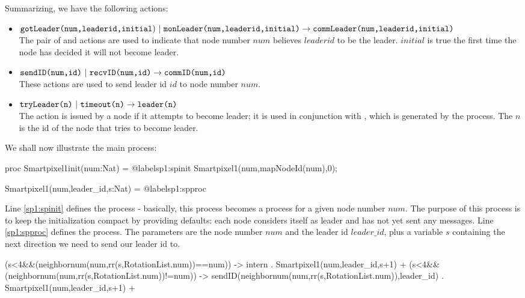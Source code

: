 Summarizing, we have the following actions:

\begin{itemize}
\item $\texttt{gotLeader(num,leaderid,initial}) ~|~ \texttt{monLeader(num,leaderid,initial)} \rightarrow \\ \texttt{commLeader(num,leaderid,initial)}$ \\
The pair of  and  actions are used to indicate that node number $num$ believes $leaderid$ to be the leader. $initial$ is true the first time the node has decided it will not become leader.
\item $\texttt{sendID(num,id)} ~|~ \texttt{recvID(num,id)} \rightarrow \texttt{commID(num,id)}$ \\
These actions are used to send leader id $id$ to node number $num$.
\item $\texttt{tryLeader(n)} ~|~ \texttt{timeout(n)} \rightarrow \texttt{leader(n)}$ \\
The  action is issued by a node if it attempts to become leader; it is used in conjunction with , which is generated by the  process. The $n$ is the id of the node that tries to become leader.
\end{itemize}

We shall now illustrate the main  process:

\begin{codeverb}
proc	Smartpixel1init(num:Nat) = @label{sp1:spinit}
	 Smartpixel1(num,mapNodeId(num),0); 

	Smartpixel1(num,leader_id,s:Nat) = @label{sp1:spproc}
\end{codeverb}

Line \ref{sp1:spinit} defines the  process - basically, this process becomes a  process for a given node number $num$. The purpose of this process is to keep the initialization compact by providing defaults: each node considers itself as leader and has not yet sent any messages. Line \ref{sp1:spproc} defines the  process. The parameters are the node number $num$ and the leader id $leader\_id$, plus a variable $s$ containing the next direction we need to send our leader id to.

\begin{codeverb}
(s<4&&(neighbornum(num,rr(s,RotationList.num))==num)) ->
    intern . Smartpixel1(num,leader_id,s+1) +
(s<4&&(neighbornum(num,rr(s,RotationList.num))!=num)) ->
    sendID(neighbornum(num,rr(s,RotationList.num)),leader_id) .
     Smartpixel1(num,leader_id,s+1) +
\end{codeverb}

